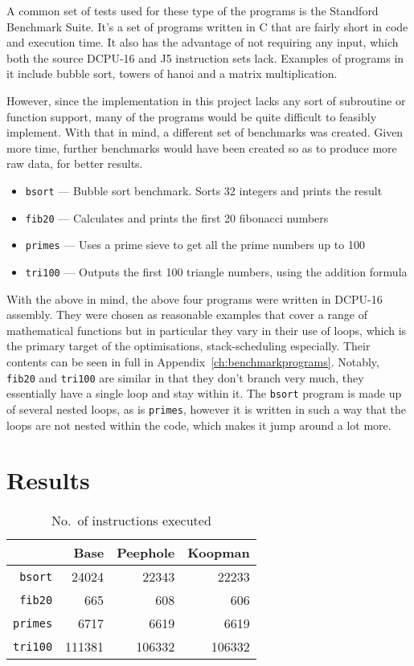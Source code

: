 A common set of tests used for these type of the programs is the Standford
Benchmark Suite\cite{stanford}. It's a set of programs written in C that are
fairly short in code and execution time. It also has the advantage of not
requiring any input, which both the source DCPU-16 and J5 instruction sets lack.
Examples of programs in it include bubble sort, towers of hanoi and a matrix
multiplication.

However, since the implementation in this project lacks any sort of subroutine
or function support, many of the programs would be quite difficult to feasibly
implement. With that in mind, a different set of benchmarks was created. Given
more time, further benchmarks would have been created so as to produce more
raw data, for better results.

\begin{itemize}[noitemsep]
  \item \texttt{bsort} --- Bubble sort benchmark. Sorts 32 integers and prints
  the result
  \item \texttt{fib20} --- Calculates and prints the first 20 fibonacci numbers
  \item \texttt{primes} --- Uses a prime sieve to get all the prime numbers up
  to 100
  \item \texttt{tri100} --- Outputs the first 100 triangle numbers, using the
    addition formula
\end{itemize}

With the above in mind, the above four programs were written in DCPU-16
assembly. They were chosen as reasonable examples that cover a range of
mathematical functions but in particular they vary in their use of loops, which
is the primary target of the optimisations, stack-scheduling especially. Their
contents can be seen in full in Appendix~\ref{ch:benchmarkprograms}. Notably,
\texttt{fib20} and \texttt{tri100} are similar in that they don't branch very
much, they essentially have a single loop and stay within it. The \texttt{bsort}
program is made up of several nested loops, as is \texttt{primes}, however it is
written in such a way that the loops are not nested within the code, which makes
it jump around a lot more.

\section{Results}

\begin{table}
  \begin{tabular}{r r r r}
                    &   Base & Peephole & Koopman \\ \toprule
    \texttt{bsort}  &  24024 &    22343 &   22233 \\ \midrule
    \texttt{fib20}  &    665 &      608 &     606 \\ \midrule
    \texttt{primes} &   6717 &     6619 &    6619 \\ \midrule
    \texttt{tri100} & 111381 &   106332 &  106332 \\ \midrule
  \end{tabular}
  \caption{No.\ of instructions executed}\label{tab:instructions}
\end{table}

